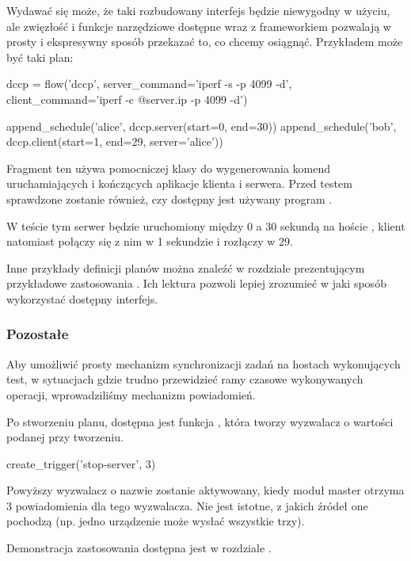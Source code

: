 \documentclass[00-praca-magisterska.tex]{subfiles}
\begin{document}
Wydawać się może, że taki rozbudowany interfejs będzie niewygodny w użyciu, ale
zwięzłość i funkcje narzędziowe dostępne wraz z frameworkiem pozwalają w prosty
i ekspresywny sposób przekazać to, co chcemy osiągnąć. Przykładem może być taki
plan:

\begin{pythoncode}
  dccp = flow('dccp',
      server_command='iperf -s -p 4099 -d',
      client_command='iperf -c @{server.ip} -p 4099 -d')

  append_schedule('alice', dccp.server(start=0, end=30))
  append_schedule('bob',   dccp.client(start=1, end=29, server='alice'))
\end{pythoncode}

Fragment ten używa pomocniczej klasy  do wygenerowania komend
uruchamiających i kończących aplikacje klienta i serwera. Przed testem
sprawdzone zostanie również, czy dostępny jest używany program .

W teście tym serwer będzie uruchomiony między 0 a 30 sekundą na
hoście , klient natomiast połączy się z nim w 1 sekundzie i rozłączy
w 29.

Inne przykłady definicji planów można znaleźć w rozdziale prezentującym
przykładowe zastosowania . Ich lektura
pozwoli lepiej zrozumieć w jaki sposób wykorzystać dostępny interfejs.

\subsubsection{Pozostałe}

Aby umożliwić prosty mechanizm synchronizacji zadań na hostach wykonujących
test, w sytuacjach gdzie trudno przewidzieć ramy czasowe wykonywanych operacji,
wprowadziliśmy mechanizm powiadomień.

Po stworzeniu planu, dostępna jest funkcja , która tworzy
wyzwalacz o wartości podanej przy tworzeniu.

\begin{pythoncode}
  create_trigger('stop-server', 3)
\end{pythoncode}

Powyższy wyzwalacz o nazwie  zostanie aktywowany, kiedy moduł
master otrzyma 3 powiadomienia dla tego wyzwalacza. Nie jest istotne, z jakich
źródeł one pochodzą (np. jedno urządzenie może wysłać wszystkie trzy).

Demonstracja zastosowania dostępna jest w rozdziale .
\end{document}
